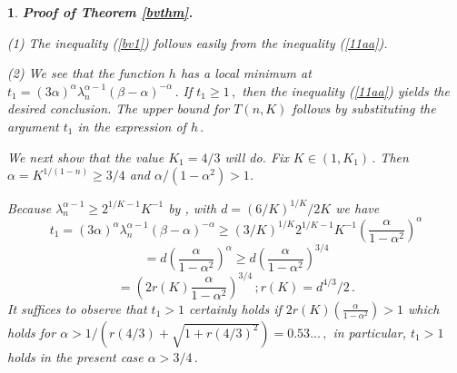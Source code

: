\documentclass[12pt,a4paper,leqno]{amsart}
\theoremstyle{plain}
\newtheorem{subsec}[equation]{}
\numberwithin{equation}{section}          %
\begin{document}
\begin{subsec} {\bf Proof of Theorem \ref{bvthm}.} {\rm (1) The inequality (\ref{bv1})
follows easily from the inequality (\ref{11aa}).

(2) We see that the function $h$ has a local minimum at $t_1= (3
\alpha)^{\alpha} \lambda_n^{\alpha-1} (\beta-\alpha)^{-\alpha} \,.$ If $t_1
\ge 1\,,$ then the inequality (\ref{11aa}) yields the desired
conclusion. The upper bound for $T(n,K)$ follows by substituting the
argument $t_1$ in the expression of $h\,.$ %


We next show that the value $K_1=4/3$ will do. Fix $K\in(1,K_1)\,.$
Then $\alpha= K^{1/(1-n)}\ge 3/4$ and $\alpha/(1- \alpha^2)>1$.

Because $\lambda_n^{ \alpha-1}\ge 2^{1/K -1} K^{-1}$ by \cite[Lemma 7.50(1)]{vuobook}, with $d=(6/K)^{1/K}/2K$
we have
$$
t_1=(3\alpha)^\alpha \lambda_n^{\alpha-1}(\beta-\alpha)^{-\alpha} \ge (3/K)^{1/K} 2^{1/K-1} K^{-1}
\left(\frac{\alpha}{1-\alpha^2} \right)^{\alpha}
$$
$$
=d\left(\frac{\alpha}{1-\alpha^2} \right)^{\alpha}\ge d \left(\frac{\alpha}{1-\alpha^2} \right)^{3/4}
$$
$$
  = \left(2 r(K) \frac{\alpha}{1-\alpha^2} \right)^{3/4}\,;
 r(K)= d^{4/3}/2 \,.
$$
It suffices to observe that $t_1>1$ certainly holds if $2r(K)(\frac{\alpha}{1-\alpha^2})>1$ which holds
for $ \alpha > 1/(r(4/3)+  \sqrt{1+r(4/3)^2})= 0.53...\,,$ in particular, $t_1>1$ holds in the present case
$\alpha>3/4\,.$

}
\end{subsec}
\end{document}
